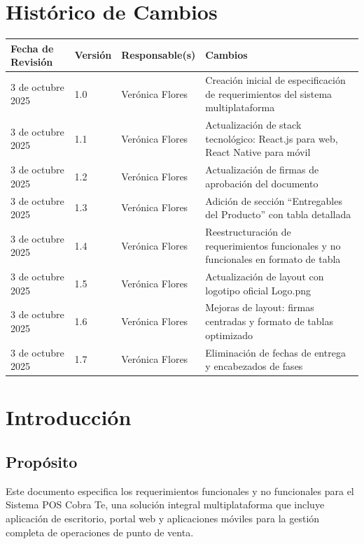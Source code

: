 \documentclass[12pt,letterpaper]{article}
\begin{document}
\newpage

\tableofcontents
\newpage

\section*{Histórico de Cambios}

\begin{longtable}{|p{3cm}|p{2cm}|p{4cm}|p{6cm}|}
\hline
\rowcolor{cobrablue!20}
\textbf{Fecha de Revisión} & \textbf{Versión} & \textbf{Responsable(s)} & \textbf{Cambios} \\
\hline
\endhead
3 de octubre 2025 & 1.0 & Verónica Flores & Creación inicial de especificación de requerimientos del sistema multiplataforma \\
\hline
3 de octubre 2025 & 1.1 & Verónica Flores & Actualización de stack tecnológico: React.js para web, React Native para móvil \\
\hline
3 de octubre 2025 & 1.2 & Verónica Flores & Actualización de firmas de aprobación del documento \\
\hline
3 de octubre 2025 & 1.3 & Verónica Flores & Adición de sección ``Entregables del Producto'' con tabla detallada \\
\hline
3 de octubre 2025 & 1.4 & Verónica Flores & Reestructuración de requerimientos funcionales y no funcionales en formato de tabla \\
\hline
3 de octubre 2025 & 1.5 & Verónica Flores & Actualización de layout con logotipo oficial Logo.png \\
\hline
3 de octubre 2025 & 1.6 & Verónica Flores & Mejoras de layout: firmas centradas y formato de tablas optimizado \\
\hline
3 de octubre 2025 & 1.7 & Verónica Flores & Eliminación de fechas de entrega y encabezados de fases \\
\hline
\end{longtable}

\newpage

\section{Introducción}

\subsection{Propósito}
Este documento especifica los requerimientos funcionales y no funcionales para el Sistema POS Cobra Te, una solución integral multiplataforma que incluye aplicación de escritorio, portal web y aplicaciones móviles para la gestión completa de operaciones de punto de venta.
\end{document}
